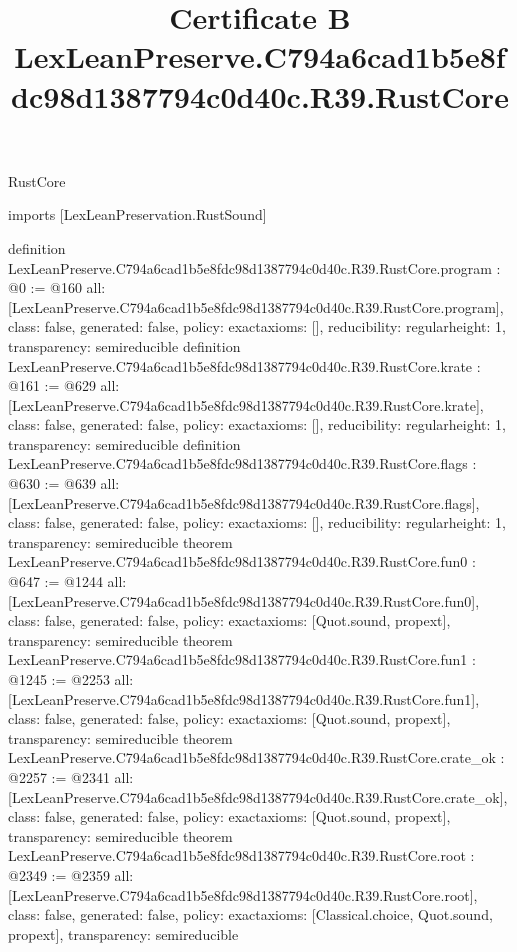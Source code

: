 \begin{lexlean}{RustCore}
\title{Certificate B LexLeanPreserve.C794a6cad1b5e8fdc98d1387794c0d40c.R39.RustCore}
\begin{coremodule}
imports [LexLeanPreservation.RustSound]

definition LexLeanPreserve.C794a6cad1b5e8fdc98d1387794c0d40c.R39.RustCore.program : @0 := @160 {
  all: [LexLeanPreserve.C794a6cad1b5e8fdc98d1387794c0d40c.R39.RustCore.program],
  class: false,
  generated: false,
  policy: exact{axioms: []},
  reducibility: regular{height: 1},
  transparency: semireducible
}
definition LexLeanPreserve.C794a6cad1b5e8fdc98d1387794c0d40c.R39.RustCore.krate : @161 := @629 {
  all: [LexLeanPreserve.C794a6cad1b5e8fdc98d1387794c0d40c.R39.RustCore.krate],
  class: false,
  generated: false,
  policy: exact{axioms: []},
  reducibility: regular{height: 1},
  transparency: semireducible
}
definition LexLeanPreserve.C794a6cad1b5e8fdc98d1387794c0d40c.R39.RustCore.flags : @630 := @639 {
  all: [LexLeanPreserve.C794a6cad1b5e8fdc98d1387794c0d40c.R39.RustCore.flags],
  class: false,
  generated: false,
  policy: exact{axioms: []},
  reducibility: regular{height: 1},
  transparency: semireducible
}
theorem LexLeanPreserve.C794a6cad1b5e8fdc98d1387794c0d40c.R39.RustCore.fun0 : @647 := @1244 {
  all: [LexLeanPreserve.C794a6cad1b5e8fdc98d1387794c0d40c.R39.RustCore.fun0],
  class: false,
  generated: false,
  policy: exact{axioms: [Quot.sound, propext]},
  transparency: semireducible
}
theorem LexLeanPreserve.C794a6cad1b5e8fdc98d1387794c0d40c.R39.RustCore.fun1 : @1245 := @2253 {
  all: [LexLeanPreserve.C794a6cad1b5e8fdc98d1387794c0d40c.R39.RustCore.fun1],
  class: false,
  generated: false,
  policy: exact{axioms: [Quot.sound, propext]},
  transparency: semireducible
}
theorem LexLeanPreserve.C794a6cad1b5e8fdc98d1387794c0d40c.R39.RustCore.crate_ok : @2257 := @2341 {
  all: [LexLeanPreserve.C794a6cad1b5e8fdc98d1387794c0d40c.R39.RustCore.crate_ok],
  class: false,
  generated: false,
  policy: exact{axioms: [Quot.sound, propext]},
  transparency: semireducible
}
theorem LexLeanPreserve.C794a6cad1b5e8fdc98d1387794c0d40c.R39.RustCore.root : @2349 := @2359 {
  all: [LexLeanPreserve.C794a6cad1b5e8fdc98d1387794c0d40c.R39.RustCore.root],
  class: false,
  generated: false,
  policy: exact{axioms: [Classical.choice, Quot.sound, propext]},
  transparency: semireducible
}


\end{coremodule}
\end{lexlean}
